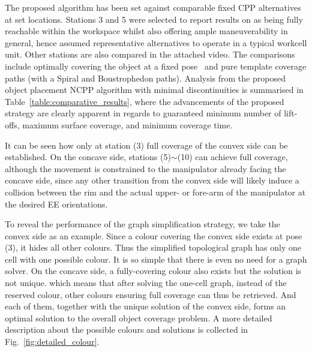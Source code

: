 \documentclass[letterpaper,journal]{IEEEtran}
\begin{document}
The proposed algorithm has been set against comparable fixed CPP alternatives at set locations. Stations 3 and 5 were selected to report results on as being fully reachable within the workspace whilst also offering ample maneuverability in general, hence assumed representative alternatives to operate in a typical workcell unit. Other stations are also compared in the attached video. The comparisons include optimally covering the object at a fixed pose~\cite{Yang2020Cellular} and pure template coverage paths (with a Spiral and Boustrophedon paths). Analysis from the proposed object placement NCPP  algorithm with minimal discontinuities is summarised in Table~\ref{table:comparative_results}, where the advancements of the proposed strategy are clearly apparent in regards to guaranteed minimum number of lift-offs, maximum surface coverage, and minimum coverage time. 


It can be seen how only at station (3) full coverage of the convex side can be established. On the concave side, 
stations (5)$\sim$(10) can achieve full coverage, although the movement is constrained to the manipulator already facing the concave side, since any other transition from the convex side will likely induce a collision between the rim and the actual upper- or fore-arm of the manipulator at the desired EE orientations.


To reveal the performance of the graph simplification strategy, we take the convex side as an example. Since a colour covering the convex side exists at pose (3), it hides all other colours. Thus the simplified topological graph has only one cell with one possible colour. It is so simple that there is even no need for a graph solver. 
On the concave side, a fully-covering colour also exists but the solution is not unique. which means that after solving the one-cell graph, instead of the reserved colour, other colours ensuring full coverage can thus be retrieved. And each of them, together with the unique solution of the convex side, forms an optimal solution to the overall object coverage problem. A more detailed description about the possible colours and solutions is collected in Fig.~\ref{fig:detailed_colour}. 
\end{document}
